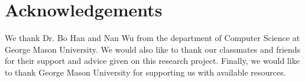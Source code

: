 \documentclass[sigconf]{acmart}
\begin{document}
\section{Acknowledgements}

We thank Dr. Bo Han and Nan Wu from the department of Computer Science at George Mason University. We would also like to thank our classmates and friends for their support and advice given on this research project. Finally, we would like to thank George Mason University for supporting us with available resources.












\end{document}

